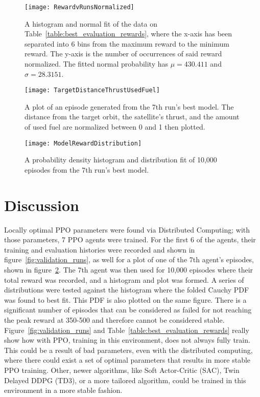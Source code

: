 \begin{figure}
	\centering
	\texttt{[image: RewardvRunsNormalized]}
	\caption{A histogram and normal fit of the data on Table~\ref{table:best_evaluation_rewards}, where the x-axis has been separated into 6 bins from the maximum reward to the minimum reward. The y-axis is the number of occurrences of said reward normalized. The fitted normal probability has $\mu=430.411$ and $\sigma=28.3151$.}
	\label{fig:norm_hist_reward}
\end{figure}

\begin{figure}
	\centering
	\texttt{[image: TargetDistanceThrustUsedFuel]}
	\caption{A plot of an episode generated from the 7th run's best model. The distance from the target orbit, the satellite's thrust, and the amount of used fuel are normalized between 0 and 1 then plotted.}
	\label{fig:tdtuf}
\end{figure}

\begin{figure}
	\centering
	\texttt{[image: ModelRewardDistribution]}
	\caption{A probability density histogram and distribution fit of 10,000 episodes from the 7th run's best model.}
	\label{fig:model_reward_distribution}
\end{figure}

\section{Discussion}

Locally optimal PPO parameters were found via Distributed Computing; with those parameters, 7 PPO agents were trained. For the first 6 of the agents, their training and evaluation histories were recorded and shown in figure~\ref{fig:validation_runs}, as well for a plot of one of the 7th agent's episodes, shown in figure~\ref{fig:tdtuf}. The 7th agent was then used for 10,000 episodes where their total reward was recorded, and a histogram and plot was formed. A series of distributions were tested against the histogram where the folded Cauchy PDF was found to best fit. This PDF is also plotted on the same figure. There is a significant number of episodes that can be considered as failed for not reaching the peak reward at 350-500 and therefore cannot be considered stable. Figure~\ref{fig:validation_runs} and Table~\ref{table:best_evaluation_rewards} really show how with PPO, training in this environment, does not always fully train. This could be a result of bad parameters, even with the distributed computing, where there could exist a set of optimal parameters that results in more stable PPO training. Other, newer algorithms, like Soft Actor-Critic (SAC), Twin Delayed DDPG (TD3), or a more tailored algorithm, could be trained in this environment in a more stable fashion. 

